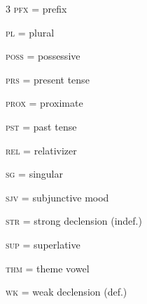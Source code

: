 \documentclass{article}[12pt]
\begin{document}
\begin{multicols}{3}
\textsc{pfx} = prefix

\textsc{pl} = plural

\textsc{poss} = possessive

\textsc{prs} = present tense

\textsc{prox} = proximate

\textsc{pst} = past tense

\textsc{rel} = relativizer

\textsc{sg} = singular

\textsc{sjv} = subjunctive mood

\textsc{str} = strong declension (indef.)

\textsc{sup} = superlative

\textsc{thm} = theme vowel


\textsc{wk} = weak declension (def.)

\end{multicols}

\printbibliography
\end{document}
